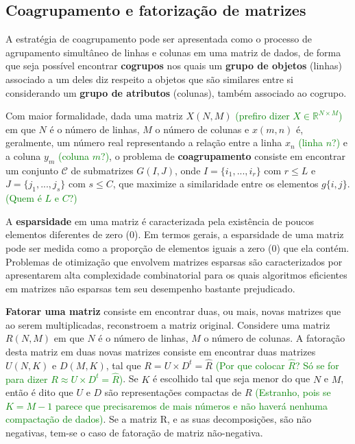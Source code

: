 \documentclass[
    12pt,                %
    oneside,            %
    a4paper,            %
    english,            %
    brazil                %
    ]{abntex2ppgsi}
\begin{document}
\subsection{Coagrupamento e fatorização de matrizes}

A estratégia de coagrupamento pode ser apresentada como o processo de agrupamento simultâneo de linhas e colunas em uma matriz de dados, de forma que seja possível encontrar \textbf{cogrupos} nos quais um \textbf{grupo de objetos} (linhas) associado a um deles diz respeito a objetos que são similares entre si considerando um \textbf{grupo de atributos} (colunas), também associado ao cogrupo.

Com maior formalidade, dada uma matriz $X(N,M)$ \textcolor{green}{(prefiro dizer $X\in\mathds{R}^{N\times M}$)} em que $N$ é o número de linhas, $M$ o número de colunas e $x(m,n)$ é, geralmente, um número real representando a relação entre a linha $x_n$ \textcolor{green}{(linha $n$?)} e a coluna $y_m$ \textcolor{green}{(coluna $m$?)}, o problema de \textbf{coagrupamento} consiste em encontrar um conjunto $\mathcal{C}$ de submatrizes $G(I,J)$, onde $I=\{i_1, ..., i_r\}$ com $r \leq L$ e $J=\{j_1, ..., j_s\}$ com $s \leq C$, que maximize a similaridade entre os elementos $g\{i,j\}$. \textcolor{green}{(Quem é $L$ e $C$?)}


A \textbf{esparsidade} em uma matriz é caracterizada pela existência de poucos elementos diferentes de zero ({0}). Em termos gerais, a esparsidade de uma matriz pode ser medida como a proporção de elementos iguais a zero ($0$) que ela contém. Problemas de otimização que envolvem matrizes esparsas são caracterizados por apresentarem alta complexidade combinatorial para os quais algoritmos eficientes em matrizes não esparsas tem seu desempenho bastante prejudicado.



\textbf{Fatorar uma matriz} consiste em encontrar duas, ou mais, novas matrizes que ao serem multiplicadas, reconstroem a matriz original. Considere uma matriz $R(N,M)$ em que $N$ é o número de linhas, $M$ o número de colunas. A fatoração desta matriz em duas novas matrizes consiste em encontrar duas matrizes $U(N,K)$ e $D(M,K)$, tal que $ R = U \times D^t = \hat{R} $ \textcolor{green}{(Por que colocar $\hat{R}$? Só se for para dizer $ R \approx U \times D^t = \hat{R} $)}. Se $K$ é escolhido tal que seja menor do que $N$ e $M$, então é dito que $U$ e $D$ são representações compactas de $R$ \textcolor{green}{(Estranho, pois se $K=M-1$ parece que precisaremos de mais números e não haverá nenhuma compactação de dados)}. Se a matriz R, e as suas decomposições, são não negativas, tem-se o caso de  fatoração de matriz não-negativa.
\end{document}
